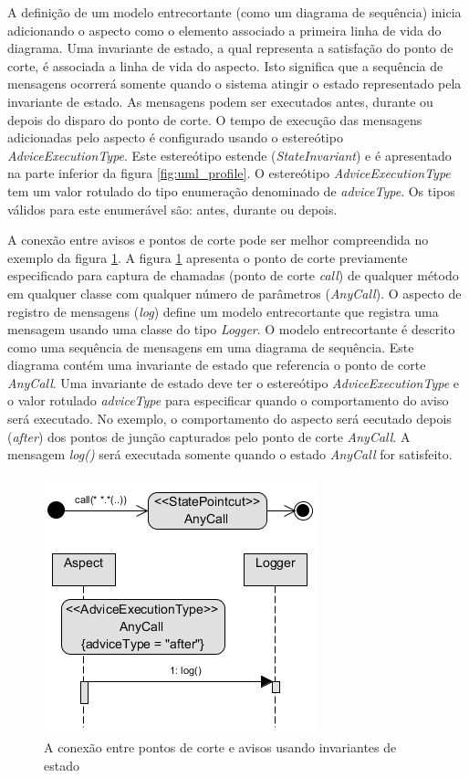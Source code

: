 A definição de um modelo entrecortante (como um diagrama de sequência) inicia adicionando o aspecto como o elemento associado a primeira linha de vida
do diagrama. Uma invariante de estado, a qual representa a satisfação do ponto de corte, é associada a linha de vida do aspecto. Isto significa que a
sequência de mensagens ocorrerá somente quando o sistema atingir o estado representado pela invariante de estado. As mensagens podem ser executados
antes, durante ou depois do disparo do ponto de corte. O tempo de execução das mensagens adicionadas pelo aspecto é configurado usando o estereótipo
\textit{AdviceExecutionType}. Este estereótipo estende (\textit{StateInvariant}) e é apresentado na parte inferior da figura \ref{fig:uml_profile}. O
estereótipo \textit{AdviceExecutionType} tem um valor rotulado do tipo enumeração denominado de \textit{adviceType}. Os tipos válidos para este enumerável são:
antes, durante ou depois.

A conexão entre avisos e pontos de corte pode ser melhor compreendida no exemplo da figura \ref{fig:behavioral_profile_example}. A figura
\ref{fig:behavioral_profile_example} apresenta o ponto de corte previamente especificado para captura de chamadas (ponto de corte \textit{call}) de
qualquer método em qualquer classe com qualquer número de parâmetros (\textit{AnyCall}). O aspecto de registro de mensagens (\textit{log}) define um
modelo entrecortante que registra uma mensagem usando uma classe do tipo \textit{Logger}. O modelo entrecortante é descrito como uma sequência de
mensagens em uma diagrama de sequência. Este diagrama contém uma invariante de estado que referencia o ponto de corte \textit{AnyCall}. Uma invariante
de estado deve ter o estereótipo \textit{AdviceExecutionType} e o valor rotulado \textit{adviceType} para especificar quando o comportamento do aviso
será executado. No exemplo, o comportamento do aspecto será eecutado depois (\textit{after}) dos pontos de junção capturados pelo ponto de corte
\textit{AnyCall}. A mensagem \textit{log()} será executada somente quando o estado \textit{AnyCall} for satisfeito.


\begin{figure}[h]
	\centering
	\includegraphics{img/behavioral_profile_example.png}
	\caption{A conexão entre pontos de corte e avisos usando invariantes de estado}\label{fig:behavioral_profile_example}
\end{figure}

